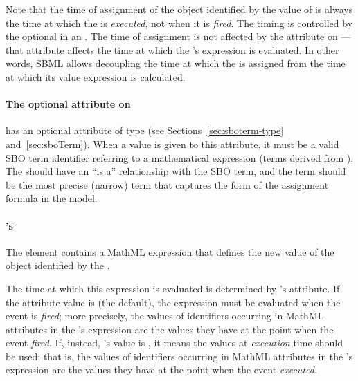 \begin{blockChanged}

Note that the time of assignment of the object identified by the
value of  is always the time at which the \Event
is \emph{executed}, not when it is \emph{fired}.  The timing is
controlled by the optional \Delay in an \Event.  The time of
assignment is not affected by the 
attribute on \Event---that attribute affects the time at which the
\EventAssignment's  expression is evaluated.  In other
words, SBML allows decoupling the time at which the
 is assigned from the time at which its value
expression is calculated.

\end{blockChanged}


\paragraph{The optional  attribute on }
\label{sec:eventassignment-sboterm}

\EventAssignment has an optional 
attribute of type  (see
Sections~\ref{sec:sboterm-type} and~\ref{sec:sboTerm}).  When a
value is given to this attribute, it must be a valid SBO term
identifier referring to a mathematical expression (\ie terms
derived from \sbomathformula).  The \EventAssignment should have
an ``is a'' relationship with the SBO term, and the term should be
the most precise (narrow) term that captures the form of the
assignment formula in the model.


\paragraph{'s }

The  element contains a MathML expression that defines
the new value of the object identified by the .

The time at which this expression is evaluated is determined by
\Event's  attribute.  If the
attribute value is  (the default), the expression must
be evaluated when the event is \emph{fired}; more precisely, the
values of identifiers occurring in MathML  attributes in
the \EventAssignment's  expression are the values they
have at the point when the event \emph{fired}.  If, instead,
's value is , it means
the values at \emph{execution} time should be used; that is, the
values of identifiers occurring in MathML  attributes in
the \EventAssignment's  expression are the values they
have at the point when the event \emph{executed}.


